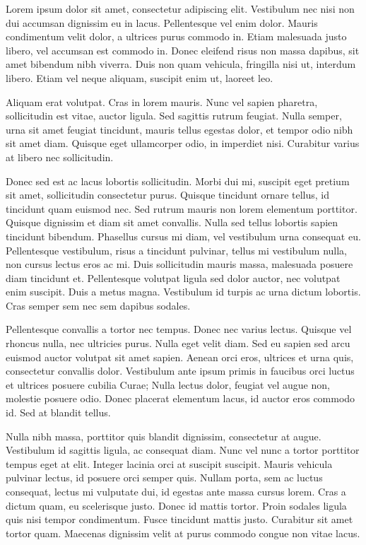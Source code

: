 
Lorem ipsum dolor sit amet, consectetur adipiscing elit. Vestibulum
nec nisi non dui accumsan dignissim eu in lacus. Pellentesque vel
enim dolor. Mauris condimentum velit dolor, a ultrices purus commodo
in. Etiam malesuada justo libero, vel accumsan est commodo in. Donec
eleifend risus non massa dapibus, sit amet bibendum nibh viverra.
Duis non quam vehicula, fringilla nisi ut, interdum libero. Etiam vel
neque aliquam, suscipit enim ut, laoreet leo.

Aliquam erat volutpat. Cras in lorem mauris. Nunc vel sapien
pharetra, sollicitudin est vitae, auctor ligula. Sed sagittis rutrum
feugiat. Nulla semper, urna sit amet feugiat tincidunt, mauris tellus
egestas dolor, et tempor odio nibh sit amet diam. Quisque eget
ullamcorper odio, in imperdiet nisi. Curabitur varius at libero nec
sollicitudin.

Donec sed est ac lacus lobortis sollicitudin. Morbi dui mi, suscipit
eget pretium sit amet, sollicitudin consectetur purus. Quisque
tincidunt ornare tellus, id tincidunt quam euismod nec. Sed rutrum
mauris non lorem elementum porttitor. Quisque dignissim et diam sit
amet convallis. Nulla sed tellus lobortis sapien tincidunt bibendum.
Phasellus cursus mi diam, vel vestibulum urna consequat eu.
Pellentesque vestibulum, risus a tincidunt pulvinar, tellus mi
vestibulum nulla, non cursus lectus eros ac mi. Duis sollicitudin
mauris massa, malesuada posuere diam tincidunt et. Pellentesque
volutpat ligula sed dolor auctor, nec volutpat enim suscipit. Duis a
metus magna. Vestibulum id turpis ac urna dictum lobortis. Cras
semper sem nec sem dapibus sodales.

Pellentesque convallis a tortor nec tempus. Donec nec varius lectus.
Quisque vel rhoncus nulla, nec ultricies purus. Nulla eget velit
diam. Sed eu sapien sed arcu euismod auctor volutpat sit amet sapien.
Aenean orci eros, ultrices et urna quis, consectetur convallis dolor.
Vestibulum ante ipsum primis in faucibus orci luctus et ultrices
posuere cubilia Curae; Nulla lectus dolor, feugiat vel augue non,
molestie posuere odio. Donec placerat elementum lacus, id auctor eros
commodo id. Sed at blandit tellus.

Nulla nibh massa, porttitor quis blandit dignissim, consectetur at
augue. Vestibulum id sagittis ligula, ac consequat diam. Nunc vel
nunc a tortor porttitor tempus eget at elit. Integer lacinia orci at
suscipit suscipit. Mauris vehicula pulvinar lectus, id posuere orci
semper quis. Nullam porta, sem ac luctus consequat, lectus mi
vulputate dui, id egestas ante massa cursus lorem. Cras a dictum
quam, eu scelerisque justo. Donec id mattis tortor. Proin sodales
ligula quis nisi tempor condimentum. Fusce tincidunt mattis justo.
Curabitur sit amet tortor quam. Maecenas dignissim velit at purus
commodo congue non vitae lacus.
